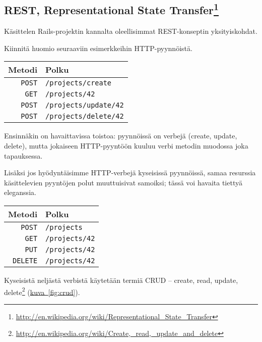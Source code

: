 \documentclass{article}
\newcommand{\myref}[2]{\hyperref[#2]{#1~\ref*{#2}}}
\newcommand{\pdfforeignlanguage}[2]{\texorpdfstring{\foreignlanguage{#1}{#2}}{#2}}
\newcommand{\eng}[1]{\pdfforeignlanguage{english}{#1}}
\begin{document}
\subsection[REST, Representational State Transfer]{REST, Representational State
Transfer\footnote{\url{http://en.wikipedia.org/wiki/Representational\_State\_Transfer}}}

Käsittelen Rails-projektin kannalta oleellisimmat REST-konseptin
yksityiskohdat.

\begin{samepage}
Kiinnitä huomio seuraaviin esimerkkeihin HTTP-pyynnöistä.

\begin{tabular}{rl}
Metodi      & Polku                      \\
\hline
\verb!POST! & \verb!/projects/create!    \\
\verb!GET!  & \verb!/projects/42!        \\
\verb!POST! & \verb!/projects/update/42! \\
\verb!POST! & \verb!/projects/delete/42! \\
\end{tabular}
\end{samepage}

Ensinnäkin on havaittavissa toistoa: pyynnöissä on verbejä (\eng{create,
update, delete}), mutta jokaiseen HTTP-pyyntöön kuuluu verbi metodin muodossa
joka tapauksessa.

\begin{samepage}
Lisäksi jos hyödyntäisimme HTTP-verbejä kyseisissä pyynnöissä, samaa resurssia
käsittelevien pyyntöjen polut muuttuisivat samoiksi; tässä voi havaita tiettyä
eleganssia.

\begin{tabular}{rl}
Metodi        & Polku               \\
\hline
\verb!POST!   & \verb!/projects!    \\
\verb!GET!    & \verb!/projects/42! \\
\verb!PUT!    & \verb!/projects/42! \\
\verb!DELETE! & \verb!/projects/42! \\
\end{tabular}
\end{samepage}

Kyseisistä neljästä verbistä käytetään termiä \eng{CRUD -- create, read,
update,
delete}\footnote{\url{http://en.wikipedia.org/wiki/Create,\_read,\_update\_and\_delete}}
(\myref{kuva}{fig:crud}).
\end{document}
